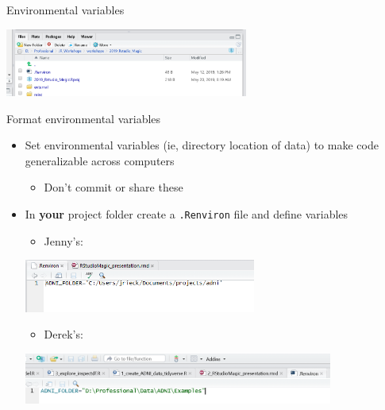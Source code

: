 \documentclass[
  ignorenonframetext,
]{beamer}
\providecommand{\tightlist}{%
  \setlength{\itemsep}{0pt}\setlength{\parskip}{0pt}}
\begin{document}
\begin{frame}{Environmental variables}
\protect\hypertarget{environmental-variables}{}

\includegraphics[width=0.6\textwidth,height=\textheight]{../external/images/Revniron.PNG}

\end{frame}

\begin{frame}[fragile]{Format environmental variables}
\protect\hypertarget{format-environmental-variables}{}

\begin{itemize}
\tightlist
\item
  Set environmental variables (ie, directory location of data) to make
  code generalizable across computers

  \begin{itemize}
  \tightlist
  \item
    Don't commit or share these
  \end{itemize}
\item
  In \textbf{your} project folder create a \texttt{.Renviron} file and
  define variables

  \begin{itemize}
  \tightlist
  \item
    Jenny's:
  \end{itemize}

  \includegraphics[width=0.6\textwidth,height=\textheight]{../external/images/setup_3_rstudio_project_environ.PNG}

  \begin{itemize}
  \tightlist
  \item
    Derek's:
  \end{itemize}

  \includegraphics[width=0.8\textwidth,height=\textheight]{../external/images/setup_3_rstudio_project_environ2.PNG}
\end{itemize}

\end{frame}
\end{document}
